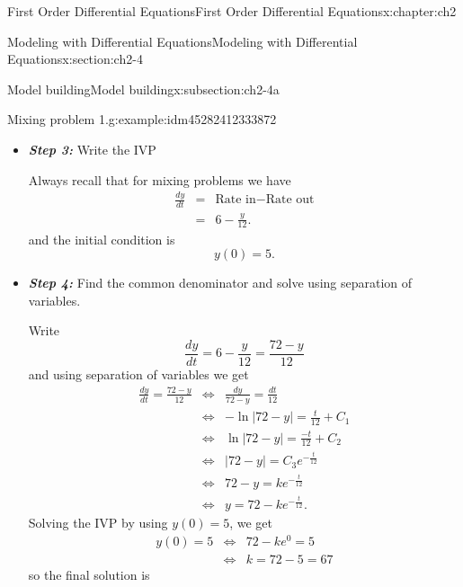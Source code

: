 \documentclass[oneside,10pt,]{book}
\newcommand{\alert}[1]{\textbf{\textit{#1}}}
\numberwithin{equation}{section}
\numberwithin{equation}{section}
\newcommand{\amp}{&}
\begin{document}
\begin{chapterptx}{First Order Differential Equations}{}{First Order Differential Equations}{}{}{x:chapter:ch2}
\begin{sectionptx}{Modeling with Differential Equations}{}{Modeling with Differential Equations}{}{}{x:section:ch2-4}
\begin{subsectionptx}{Model building}{}{Model building}{}{}{x:subsection:ch2-4a}
\begin{example}{Mixing problem 1.}{g:example:idm45282412333872}
\begin{itemize}[label=\textbullet]
\begin{align*}
\end{align*}
%
\par
and%
%
\begin{align*}
\mbox{Rate out } \amp = \amp \left(\begin{array}{c}
\mbox{concentrarion}\\
\mbox{of stuff going out}
\end{array}\right)\times\mbox{Rate}\\
\amp = \amp \left(\frac{y(t)}{60} \frac{\mbox{kg}}{\mbox{L}}\right)\times5\frac{\mbox{L}}{\mbox{min}}.\\
\amp = \amp \frac{y(t)}{12}\frac{\mbox{kg}}{\mbox{min}}.
\end{align*}
\item{}\alert{Step 3:} Write the IVP%
\par
Always recall that for mixing problems we have%
\begin{align*}
\frac{dy}{dt} \amp = \amp \mbox{Rate in}-\mbox{Rate out}\\
\amp = \amp 6-\frac{y}{12}.
\end{align*}
and the initial condition is%
\begin{equation*}
y(0)=5.
\end{equation*}
%
\item{}\alert{Step 4:} Find the common denominator and solve using separation of variables.%
\par
Write%
\begin{equation*}
\frac{dy}{dt}=6-\frac{y}{12}=\frac{72-y}{12}
\end{equation*}
and using separation of variables we get%
\begin{align*}
\frac{dy}{dt}=\frac{72-y}{12} \amp \iff \amp \frac{dy}{72-y}=\frac{dt}{12}\\
\amp \iff \amp -\ln\left|72-y\right|=\frac{t}{12}+C_{1}\\
\amp \iff \amp \ln\left|72-y\right|=\frac{-t}{12}+C_{2}\\
\amp \iff \amp \left|72-y\right|=C_{3}e^{-\frac{t}{12}}\\
\amp \iff \amp 72-y=ke^{-\frac{t}{12}}\\
\amp \iff \amp y=72-ke^{-\frac{t}{12}}.
\end{align*}
Solving the IVP by using \(y(0)=5\), we get%
\begin{align*}
y(0)=5 \amp \iff \amp 72-ke^{0}=5\\
\amp \iff \amp k=72-5=67
\end{align*}
so the final solution is%
\begin{equation*}

\end{equation*}
\end{itemize}
\end{example}
\end{subsectionptx}
\end{sectionptx}
\end{chapterptx}
\end{document}
